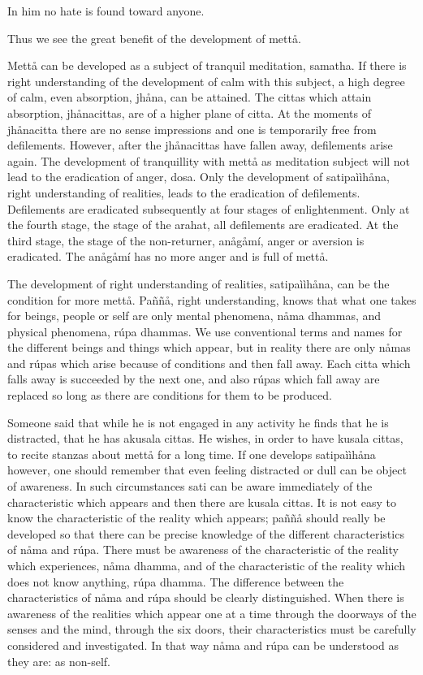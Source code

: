\documentclass[12pt,twoside]{article}
\begin{document}
In him no hate is found toward anyone. 


\bigskip

Thus we see the great benefit of the development of mett{\aa}. 

Mett{\aa} can be developed as a subject of tranquil meditation, samatha.
If there is right understanding of the development of calm with this
subject, a high degree of calm, even absorption, jh{\aa}na, can be
attained. The cittas which attain absorption, jh{\aa}nacittas, are of a
higher plane of citta. At the moments of jh{\aa}nacitta there are no
sense impressions and one is temporarily free from defilements.
However, after the jh{\aa}nacittas have fallen away, defilements arise
again. The development of tranquillity with mett{\aa} as meditation
subject will not lead to the eradication of anger, dosa. Only the
development of satipa\`i\`ih{\aa}na, right understanding of realities,
leads to the eradication of defilements. Defilements are eradicated
subsequently at four stages of enlightenment. Only at the fourth stage,
the stage of the arahat, all defilements are eradicated. At the third
stage, the stage of the
{\textasciigrave}{\textasciigrave}non{}-returner{\textquotesingle}{\textquotesingle},
an{\aa}g{\aa}m\'i, anger or aversion is eradicated. The
an{\aa}g{\aa}m\'i has no more anger and is full of mett{\aa}. 

The development of right understanding of realities,
satipa\`i\`ih{\aa}na, can be the condition for more mett{\aa}.
Pa\~n\~n{\aa}, right understanding, knows that what one takes for
beings, people or self are only mental phenomena, n{\aa}ma dhammas, and
physical phenomena, r\'upa dhammas. We use conventional terms and names
for the different beings and things which appear, but in reality there
are only n{\aa}mas and r\'upas which arise because of conditions and
then fall away. Each citta which falls away is succeeded by the next
one, and also r\'upas which fall away are replaced so long as there are
conditions for them to be produced. 

Someone said that while he is not engaged in any activity he finds that
he is distracted, that he has akusala cittas. He wishes, in order to
have kusala cittas, to recite stanzas about mett{\aa} for a long time.
If one develops satipa\`i\`ih{\aa}na however, one should remember that
even feeling distracted or dull can be object of awareness. In such
circumstances sati can be aware immediately of the characteristic which
appears and then there are kusala cittas. It is not easy to know the
characteristic of the reality which appears; pa\~n\~n{\aa} should
really be developed so that there can be precise knowledge of the
different characteristics of n{\aa}ma and r\'upa. There must be
awareness of the characteristic of the reality which experiences,
n{\aa}ma dhamma, and of the characteristic of the reality which does
not know anything, r\'upa dhamma. The difference between the
characteristics of n{\aa}ma and r\'upa should be clearly distinguished.
When there is awareness of the realities which appear one at a time
through the doorways of the senses and the mind, through the six doors,
their characteristics must be carefully considered and investigated. In
that way n{\aa}ma and r\'upa can be understood as they are: as
non{}-self. 
\end{document}
